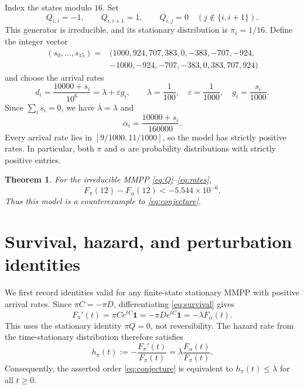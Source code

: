 \documentclass[11pt]{article}
\newtheorem{theorem}{Theorem}
\newcommand{\one}{\mathbf 1}
\begin{document}
Index the states modulo $16$. Set
\begin{equation}\label{eq:Q}
 Q_{i,i}=-1,\qquad Q_{i,i+1}=1,
 \qquad Q_{i,j}=0\quad(j\notin\{i,i+1\}).
\end{equation}
This generator is irreducible, and its stationary distribution is
$\pi_i=1/16$. Define the integer vector
\begin{equation}\label{eq:s}
\begin{split}
 (s_0,\ldots,s_{15})={}&(1000,924,707,383,0,-383,-707,-924,\\
 &-1000,-924,-707,-383,0,383,707,924)
\end{split}
\end{equation}
and choose the arrival rates
\begin{equation}\label{eq:rates}
 d_i=\frac{10000+s_i}{10^6}
 =\lambda+\varepsilon g_i,
 \qquad \lambda=\frac1{100},\quad
 \varepsilon=\frac1{1000},\quad g_i=\frac{s_i}{1000}.
\end{equation}
Since $\sum_i s_i=0$, we have $\overline\lambda=\lambda$ and
\[
 \alpha_i=\frac{10000+s_i}{160000}.
\]
Every arrival rate lies in $[9/1000,11/1000]$, so the model has strictly
positive rates. In particular, both $\pi$ and $\alpha$ are probability
distributions with strictly positive entries.

\begin{theorem}\label{thm:main}
For the irreducible MMPP \eqref{eq:Q}--\eqref{eq:rates},
\begin{equation}\label{eq:violation}
 F_\pi(12)-F_\alpha(12)<-5.544\times10^{-6}.
\end{equation}
Thus this model is a counterexample to \eqref{eq:conjecture}.
\end{theorem}

\section{Survival, hazard, and perturbation identities}
We first record identities valid for any finite-state stationary MMPP
with positive arrival rates. Since $\pi C=-\pi D$, differentiating
\eqref{eq:survival} gives
\begin{equation}\label{eq:derivative}
 F_\pi'(t)=\pi C e^{tC}\one
 =-\pi D e^{tC}\one
 =-\overline\lambda F_\alpha(t).
\end{equation}
This uses the stationary identity $\pi Q=0$, not reversibility. The
hazard rate from the time-stationary distribution therefore satisfies
\begin{equation}\label{eq:hazard}
 h_\pi(t):=-\frac{F_\pi'(t)}{F_\pi(t)}
 =\overline\lambda\frac{F_\alpha(t)}{F_\pi(t)}.
\end{equation}
Consequently, the asserted order \eqref{eq:conjecture} is equivalent to
$h_\pi(t)\leq\overline\lambda$ for all $t\geq0$.
\end{document}
